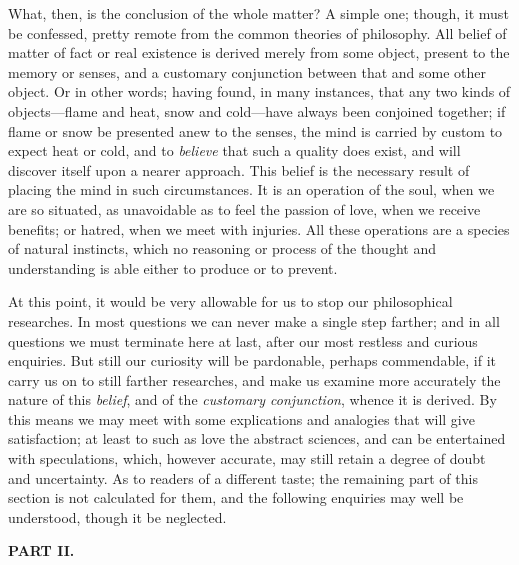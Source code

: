 \documentclass[]{article}
\newcommand*{\itemsubsection}[1]{\begin{center}\addcontentsline{toc}{subsection}{#1}\textbf{#1}\end{center}}
\begin{document}
\begin{sectionbody}
\humeparagraph  What, then, is the conclusion of the whole matter? A simple one; though, it must be confessed, pretty remote from the common theories of philosophy. All belief of matter of fact or real existence is derived merely from some object, present to the memory or senses, and a customary conjunction between that and some other object. Or in other words; having found, in many instances, that any two kinds of objects---flame and heat, snow and cold---have always been conjoined together; if flame or snow be presented anew to the senses, the mind is carried by custom to expect heat or cold, and to \emph{believe} that such a quality does exist, and will discover itself upon a nearer approach. This belief is the necessary result of placing the mind in such circumstances. It is an operation of the soul, when we are so situated, as unavoidable as to feel the passion of love, when we receive benefits; or hatred, when we meet with injuries. All these operations are a species of natural instincts, which no reasoning or process of the thought and understanding is able either to produce or to prevent.

\humeparagraph  At this point, it would be very allowable for us to stop our philosophical researches. In most questions we can never make a single step farther; and in all questions we must terminate here at last, after our most restless and curious enquiries. But still our curiosity will be pardonable, perhaps commendable, if it carry us on to still farther researches, and make us examine more accurately the nature of this \emph{belief}, and of the \emph{customary conjunction}, whence it is derived. By this means we may meet with some explications and analogies that will give satisfaction; at least to such as love the abstract sciences, and can be entertained with speculations, which, however accurate, may still retain a degree of doubt and uncertainty. As to readers of a different taste; the remaining part of this section is not calculated for them, and the following enquiries may well be understood, though it be neglected.

\end{sectionbody}

\itemsubsection{PART II.}
\end{document}
